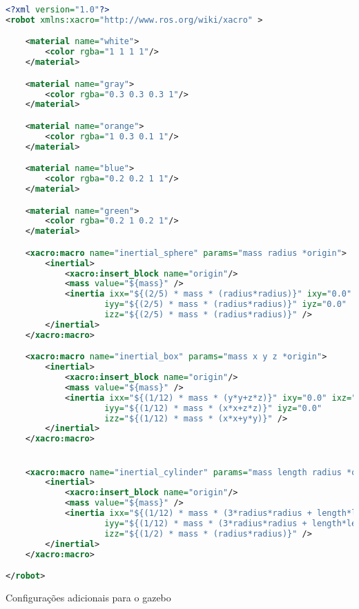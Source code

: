 \begin{lstlisting}[language=XML,caption={XML version}]
<?xml version="1.0"?>
<robot xmlns:xacro="http://www.ros.org/wiki/xacro" >

    <material name="white">
        <color rgba="1 1 1 1"/>
    </material>

    <material name="gray">
        <color rgba="0.3 0.3 0.3 1"/>
    </material>

    <material name="orange">
        <color rgba="1 0.3 0.1 1"/>
    </material>

    <material name="blue">
        <color rgba="0.2 0.2 1 1"/>
    </material>

    <material name="green">
        <color rgba="0.2 1 0.2 1"/>
    </material>

    <xacro:macro name="inertial_sphere" params="mass radius *origin">
        <inertial>
            <xacro:insert_block name="origin"/>
            <mass value="${mass}" />
            <inertia ixx="${(2/5) * mass * (radius*radius)}" ixy="0.0" ixz="0.0"
                    iyy="${(2/5) * mass * (radius*radius)}" iyz="0.0"
                    izz="${(2/5) * mass * (radius*radius)}" />
        </inertial>
    </xacro:macro>  

    <xacro:macro name="inertial_box" params="mass x y z *origin">
        <inertial>
            <xacro:insert_block name="origin"/>
            <mass value="${mass}" />
            <inertia ixx="${(1/12) * mass * (y*y+z*z)}" ixy="0.0" ixz="0.0"
                    iyy="${(1/12) * mass * (x*x+z*z)}" iyz="0.0"
                    izz="${(1/12) * mass * (x*x+y*y)}" />
        </inertial>
    </xacro:macro>


    <xacro:macro name="inertial_cylinder" params="mass length radius *origin">
        <inertial>
            <xacro:insert_block name="origin"/>
            <mass value="${mass}" />
            <inertia ixx="${(1/12) * mass * (3*radius*radius + length*length)}" ixy="0.0" ixz="0.0"
                    iyy="${(1/12) * mass * (3*radius*radius + length*length)}" iyz="0.0"
                    izz="${(1/2) * mass * (radius*radius)}" />
        </inertial>
    </xacro:macro>

</robot>
\end{lstlisting}

Configurações adicionais para o gazebo

